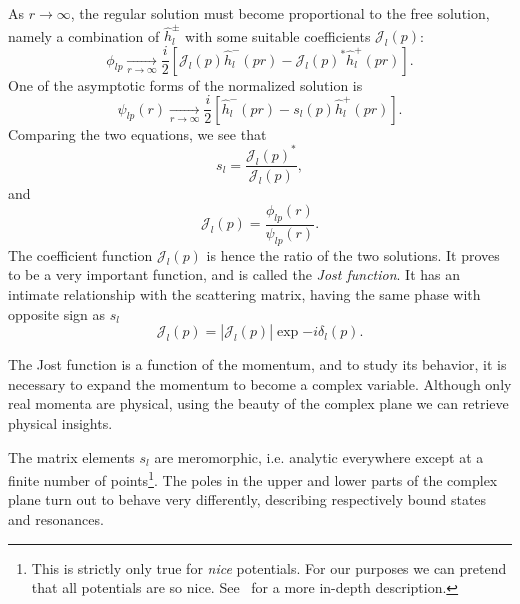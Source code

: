 \newcommand{\js}{\mathscr{J}}
As \(r\to \infty\), the regular solution must become proportional to the free
solution, namely a combination of \(\hat{h}^{\pm}_{l}\) with some suitable
coefficients \(\js_{l}(p)\):
\begin{equation}
  \label{eq:jost}
  \phi_{lp}\xrightarrow[r\to\infty]{}\frac{i}{2}\left[ \js_{l}(p) \hat{h}^{-}_{l}(pr)-\js_{l}(p)^{*}\hat{h}^{+}_{l}(pr)    \right].
\end{equation}
One of the asymptotic forms of the normalized solution is
\begin{equation*}
  \psi_{lp}(r) \xrightarrow[r\to\infty]{}\frac{i}{2} \left[ \hat{h}_{l}^{-}(pr)- s_{l}(p)\hat{h}^{+}_{l}(pr)\right].
\end{equation*}
Comparing the two equations, we see that
\begin{equation*}
  s_{l} = \frac{\js_{l}(p)^{*}}{\js_{l}(p)},
\end{equation*}
and
\begin{equation*}
  \js_{l}(p) = \frac{\phi_{lp}(r)}{\psi_{lp}(r)}.
\end{equation*}
The coefficient function \(\js_{l}(p)\) is hence the ratio of the two
solutions. It proves to be a very important function, and is called the
\textit{Jost function}. It has an intimate relationship with the scattering
matrix, having the same phase with opposite sign as \(s_{l}\)
\begin{equation*}
  \js_{l}(p) = |\js_{l}(p)|\exp{-i\delta_{l}(p)}.
\end{equation*}

The Jost function is a function of the momentum, and to study its behavior, it
is necessary to expand the momentum to become a complex variable. Although only
real momenta are physical, using the beauty of the complex plane we can retrieve
physical insights.

\newcommand{\imag}{\mathfrak{Im}}
The matrix elements \(s_{l}\) are meromorphic, i.e. analytic everywhere except
at a finite number of points\footnote{This is strictly only true for
  \textit{nice} potentials. For our purposes we can pretend that all potentials
  are so nice. See~\cite[p.~220]{taylor} for a more in-depth description.}. The
poles in the upper and lower parts of the complex plane turn out to behave very differently,
describing respectively bound states and resonances.

